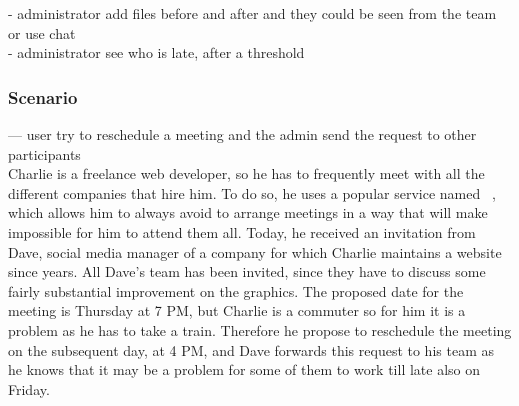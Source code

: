 - administrator add files before and after and they could be seen from the team or use chat\\
- administrator see who is late, after a threshold\\


\subsubsection{Scenario \thecountScenarios }
--- user try to reschedule a meeting and the admin send the request to other participants\\

Charlie is a freelance web developer, so he has to frequently meet with all the different companies that hire him. To do so, he uses a popular service named \projectname~, which allows him to always avoid to arrange meetings in a way that will make impossible for him to attend them all. Today, he received an invitation from Dave, social media manager of a company for which Charlie maintains a website since years. All Dave's team has been invited, since they have to discuss some fairly substantial improvement on the graphics. The proposed date for the meeting is Thursday at 7 PM, but Charlie is a commuter so for him it is a problem as he has to take a train. Therefore he propose to reschedule the meeting on the subsequent day, at 4 PM, and Dave forwards this request to his team as he knows that it may be a problem for some of them to work till late also on Friday.


